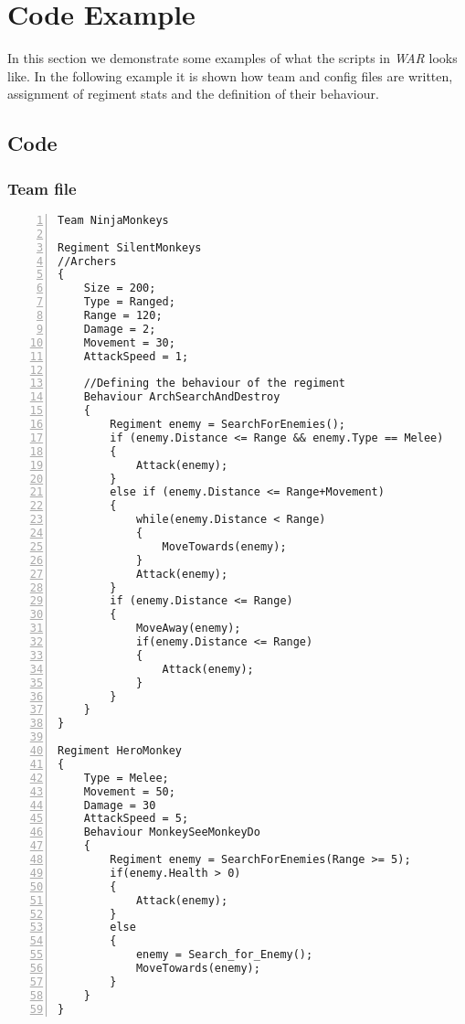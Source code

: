 \section{Code Example}
	In this section we demonstrate some examples of what the scripts in \textit{WAR} looks like.
	In the following example it is shown how team and config files are written, assignment of regiment stats and the definition of their behaviour.
	\subsection{Code}
		\subsubsection{Team file}
					\begin{lstlisting}[basicstyle=\small\sffamily,
					keywords={break,case,const,continue,default,else,enum,
					for,if,return,switch,while,do,long,void,int,float,double,
					char,struct,typedef,include,size\_t},
					keywordstyle={\color{blue}},
					comment={[l]{//}}, morecomment={[s]{/*}{*/}}, commentstyle=\itshape,
					columns={[l]flexible}, numbers=left, numberstyle=\tiny,
					frameround=fftt, frame=shadowbox, captionpos=b,
					caption={Team file},
					label=LST:code31]
Team NinjaMonkeys

Regiment SilentMonkeys
//Archers
{
	Size = 200;
	Type = Ranged;
	Range = 120;
	Damage = 2;
	Movement = 30;
	AttackSpeed = 1;
	
	//Defining the behaviour of the regiment
	Behaviour ArchSearchAndDestroy
	{
		Regiment enemy = SearchForEnemies();
		if (enemy.Distance <= Range && enemy.Type == Melee)
		{
			Attack(enemy);
		}
		else if (enemy.Distance <= Range+Movement)
		{
			while(enemy.Distance < Range)
			{
				MoveTowards(enemy);
			}
			Attack(enemy);
		}
		if (enemy.Distance <= Range)
		{
			MoveAway(enemy);
			if(enemy.Distance <= Range)
			{
				Attack(enemy);
			}
		}
	}
}

Regiment HeroMonkey
{
	Type = Melee;
	Movement = 50;
	Damage = 30
	AttackSpeed = 5;
	Behaviour MonkeySeeMonkeyDo
	{
		Regiment enemy = SearchForEnemies(Range >= 5);
		if(enemy.Health > 0)
		{
			Attack(enemy);
		}
		else
		{
			enemy = Search_for_Enemy();
			MoveTowards(enemy);
		}
	}
}
					\end{lstlisting}
